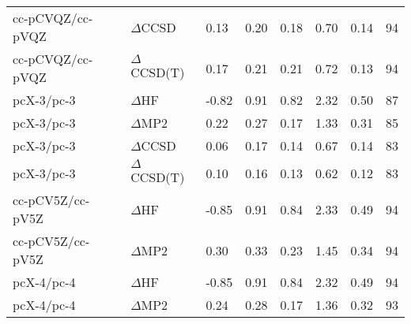 \begin{table}
\begin{tabular}{l l l l l l l l }
    cc-pCVQZ/cc-pVQZ & $\Delta$CCSD & 0.13 & 0.20 & 0.18 & 0.70 & 0.14 & 94 \\ 
    cc-pCVQZ/cc-pVQZ & $\Delta$CCSD(T) & 0.17 & 0.21 & 0.21 & 0.72 & 0.13 & 94 \\ 
    pcX-3/pc-3 & $\Delta$HF & -0.82 & 0.91 & 0.82 & 2.32 & 0.50 & 87 \\ 
    pcX-3/pc-3 & $\Delta$MP2 & 0.22 & 0.27 & 0.17 & 1.33 & 0.31 & 85 \\ 
    pcX-3/pc-3 & $\Delta$CCSD & 0.06 & 0.17 & 0.14 & 0.67 & 0.14 & 83 \\ 
    pcX-3/pc-3 & $\Delta$CCSD(T) & 0.10 & 0.16 & 0.13 & 0.62 & 0.12 & 83 \\ 
    cc-pCV5Z/cc-pV5Z & $\Delta$HF & -0.85 & 0.91 & 0.84 & 2.33 & 0.49 & 94 \\ 
    cc-pCV5Z/cc-pV5Z & $\Delta$MP2 & 0.30 & 0.33 & 0.23 & 1.45 & 0.34 & 94 \\ 
    pcX-4/pc-4 & $\Delta$HF & -0.85 & 0.91 & 0.84 & 2.32 & 0.49 & 94 \\ 
    pcX-4/pc-4 & $\Delta$MP2 & 0.24 & 0.28 & 0.17 & 1.36 & 0.32 & 93 \\ 
    \bottomrule
  \end{tabular}
\end{table}
